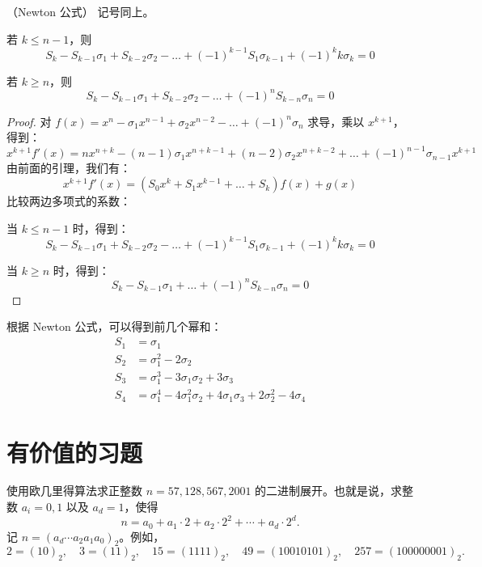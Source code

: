 \begin{proposition}（Newton 公式）
	记号同上。
	
	若 \(k \le n-1\)，则
	\[
	S_k - S_{k-1}\sigma_1 + S_{k-2}\sigma_2 - \dots + (-1)^{k-1}S_1\sigma_{k-1} + (-1)^k k \sigma_k = 0
	\]
	
	若 \(k \ge n\)，则
	\[
	S_k - S_{k-1}\sigma_1 + S_{k-2}\sigma_2 - \dots + (-1)^n S_{k-n}\sigma_n = 0
	\]
\end{proposition}
\begin{proof}
	对 \(f(x) = x^n - \sigma_1 x^{n-1} + \sigma_2 x^{n-2} - \dots + (-1)^n\sigma_n\) 求导，乘以 \(x^{k+1}\)，得到：
	\[
	x^{k+1}f'(x) = nx^{n+k} - (n-1)\sigma_1 x^{n+k-1} + (n-2)\sigma_2 x^{n+k-2} + \dots + (-1)^{n-1}\sigma_{n-1}x^{k+1}
	\]
	由前面的引理，我们有：
	\[
	x^{k+1}f'(x) = (S_0 x^k + S_1 x^{k-1} + \dots + S_k)f(x) + g(x)
	\]
	比较两边多项式的系数：
	
	当 \(k \le n-1\) 时，得到：
	\[
	S_k - S_{k-1}\sigma_1 + S_{k-2}\sigma_2 - \dots + (-1)^{k-1}S_1\sigma_{k-1} + (-1)^k k \sigma_k = 0
	\]
	
	当 \(k \ge n\) 时，得到：
	\[
	S_k - S_{k-1}\sigma_1 + \dots + (-1)^n S_{k-n}\sigma_n = 0
	\]
\end{proof}


根据 Newton 公式，可以得到前几个幂和：
\[
\begin{aligned}
	S_1 &= \sigma_1 \\
	S_2 &= \sigma_1^2 - 2\sigma_2 \\
	S_3 &= \sigma_1^3 - 3\sigma_1\sigma_2 + 3\sigma_3 \\
	S_4 &= \sigma_1^4 - 4\sigma_1^2\sigma_2 + 4\sigma_1\sigma_3 + 2\sigma_2^2 - 4\sigma_4
\end{aligned}
\]
\section{有价值的习题}

\begin{problem}
使用欧几里得算法求正整数
	\(n=57,128,567,2001\) 的二进制展开。也就是说，求整数 \(a_i=0,1\) 以及 \(a_d=1\)，使得
	\[
	n=a_0+a_1\cdot 2+a_2\cdot 2^2+\cdots+a_d\cdot 2^d.
	\]
	记 \(n=(a_d\cdots a_2a_1a_0)_2\)。例如，
	\[
	2=(10)_2,\quad 3=(11)_2,\quad 15=(1111)_2,\quad
	49=(10010101)_2,\quad 257=(100000001)_2.
	\]
\end{problem}

